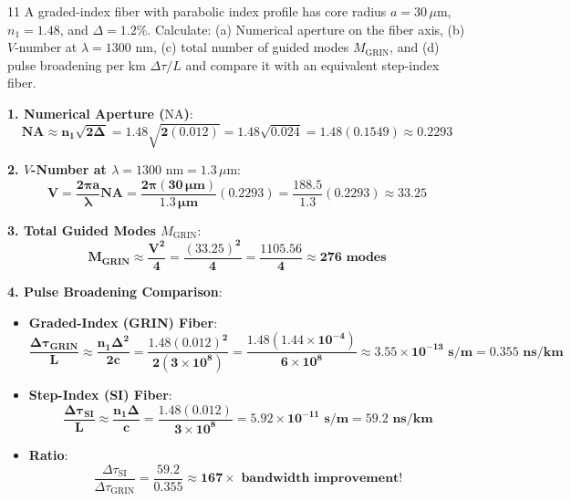 \begin{theoryq}{11}
A graded-index fiber with parabolic index profile has core radius $a = 30\,\mu\text{m}$, $n_1 = 1.48$, and $\Delta = 1.2\%$. Calculate: (a) Numerical aperture on the fiber axis, (b) $V$-number at $\lambda = 1300\text{ nm}$, (c) total number of guided modes $M_{\text{GRIN}}$, and (d) pulse broadening per km $\Delta\tau/L$ and compare it with an equivalent step-index fiber.
\end{theoryq}
\begin{theorysol}
\textbf{1. Numerical Aperture ($\text{NA}$)}:
\begin{equation}
\mathbf{\text{NA} \approx n_1 \sqrt{2\Delta} = 1.48 \sqrt{2(0.012)} = 1.48 \sqrt{0.024} = 1.48(0.1549) \approx 0.2293}
\end{equation}

\textbf{2. $V$-Number at $\lambda = 1300\text{ nm} = 1.3\,\mu\text{m}$}:
\begin{equation}
\mathbf{V = \frac{2\pi a}{\lambda}\text{NA} = \frac{2\pi (30\,\mu\text{m})}{1.3\,\mu\text{m}}(0.2293) = \frac{188.5}{1.3}(0.2293) \approx 33.25}
\end{equation}

\textbf{3. Total Guided Modes $M_{\text{GRIN}}$}:
\begin{equation}
\mathbf{M_{\text{GRIN}} \approx \frac{V^2}{4} = \frac{(33.25)^2}{4} = \frac{1105.56}{4} \approx 276\text{ modes}}
\end{equation}

\textbf{4. Pulse Broadening Comparison}:
\begin{itemize}
    \item \textbf{Graded-Index (GRIN) Fiber}:
    \begin{equation}
    \mathbf{\frac{\Delta\tau_{\text{GRIN}}}{L} \approx \frac{n_1 \Delta^2}{2 c} = \frac{1.48(0.012)^2}{2(3 \times 10^8)} = \frac{1.48(1.44 \times 10^{-4})}{6 \times 10^8} \approx 3.55 \times 10^{-13}\text{ s/m} = 0.355\text{ ns/km}}
    \end{equation}
    \item \textbf{Step-Index (SI) Fiber}:
    \begin{equation}
    \mathbf{\frac{\Delta\tau_{\text{SI}}}{L} \approx \frac{n_1 \Delta}{c} = \frac{1.48(0.012)}{3 \times 10^8} = 5.92 \times 10^{-11}\text{ s/m} = 59.2\text{ ns/km}}
    \end{equation}
    \item \textbf{Ratio}:
    \begin{equation}
    \frac{\Delta\tau_{\text{SI}}}{\Delta\tau_{\text{GRIN}}} = \frac{59.2}{0.355} \approx \mathbf{167\times \text{ bandwidth improvement!}}
    \end{equation}
\end{itemize}
\end{theorysol}
\vspace{4mm}


